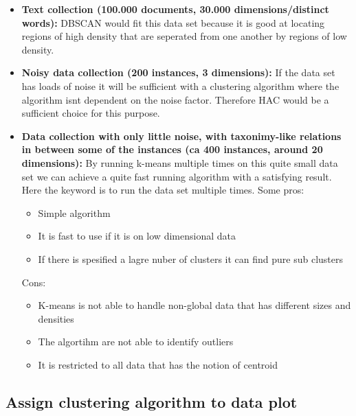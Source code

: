 		\begin{itemize}
			\item {\bf Text collection (100.000 documents, 30.000 dimensions/distinct words):}
			DBSCAN would fit this data set because it is good at locating regions of high density that
			are seperated from one another by regions of low density. 
			
			\item {\bf Noisy data collection (200 instances, 3 dimensions):}
			If the data set has loads of noise it will be sufficient with a clustering algorithm where the algorithm isnt dependent on the noise factor. Therefore HAC would be a sufficient choice for this purpose.

			\item {\bf Data collection with only little noise, with taxonimy-like relations in 
			between some of the instances (ca 400 instances, around 20 dimensions):}
			By running k-means multiple times on this quite small data set we can achieve a quite fast
			running algorithm with a satisfying result. 
			Here the keyword is to run the data set multiple times. Some pros:\\
			
			\begin{itemize}
			\item Simple algorithm
			\item It is fast to use if it is on low dimensional data
			\item If there is spesified a lagre nuber of clusters it can find pure sub clusters
			\end{itemize}

			Cons:\\
			\begin{itemize}
			\item K-means is not able to handle non-global data that has different sizes and densities
			\item The algortihm are not able to identify outliers
			\item It is restricted to all data that has the notion of centroid
			\end{itemize}

		\end{itemize}

		\noindent\makebox[\linewidth]{\rule{\textwidth}{1pt}} 

		\subsection*{Assign clustering algorithm to data plot}


